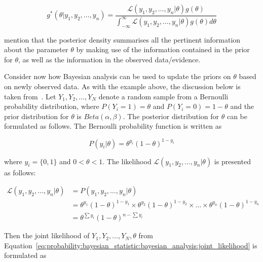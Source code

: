 \begin{equation}
	\label{eq:probability:bayesian_statistic:bayesian_analysis:posterior_density}
	g^{*}(\theta \vert y_{1}, y_{2}, \dots, y_{n}) = \frac{\mathcal{L}(y_{1}, y_{2}, \dots, y_{n} \vert \theta)g(\theta)}{\int_{-\infty}^{\infty} \mathcal{L}(y_{1}, y_{2}, \dots, y_{n} \vert \theta)g(\theta)d\theta}
\end{equation}

\citeauthor{ref:wackerly:2014}\cite{ref:wackerly:2014} mention that the posterior density summarises all the pertinent information about the parameter $\theta$ by making use of the information contained in the prior for $\theta$, as well as the information in the observed data/evidence.

Consider now how Bayesian analysis can be used to update the priors on $\theta$ based on newly observed data. As with the example above, the discussion below is taken from~\cite{ref:wackerly:2014}. Let $Y_{1}, Y_{2}, \dots, Y_{N}$ denote a random sample from a Bernoulli probability distribution, where $P(Y_{i} = 1) = \theta$ and $P(Y_{i} = 0) = 1 - \theta$ and the prior distribution for $\theta$ is $Beta(\alpha, \beta)$. The posterior distribution for $\theta$ can be formulated as follows. The Bernoulli probability function is written as

\begin{equation}
	\label{eq:probability:bayesian_statistic:bayesian_analysis:step_1}
	P(y_{i} \vert \theta) = \theta^{y_{i}}(1 - \theta)^{1-y_{i}}
\end{equation}

where $y_{i} = \{0,1\}$ and $0 < \theta < 1$. The likelihood $\mathcal{L}(y_{1}, y_{2}, \dots, y_{n} \vert \theta)$ is presented as follows:

\begin{equation}
	\label{eq:probability:bayesian_statistic:bayesian_analysis:step_2}
	\begin{split}
		\mathcal{L}(y_{1}, y_{2}, \dots, y_{n} \vert \theta)
		&= P(y_{1}, y_{2}, \dots, y_{n} \vert \theta)\\
		&= \theta^{y_{1}}(1-\theta)^{1 - y_{1}} \times \theta^{y_{2}}(1-\theta)^{1 - y_{2}} \times \dots \times \theta^{y_{n}}(1-\theta)^{1 - y_{n}}\\
		&= \theta^{\sum y_{i}}(1-\theta)^{n-\sum y_{i}}
	\end{split}
\end{equation}

Then the joint likelihood of $Y_{1}, Y_{2}, \dots, Y_{N}, \theta$ from Equation~\eqref{eq:probability:bayesian_statistic:bayesian_analysis:joint_likelihood} is formulated as


